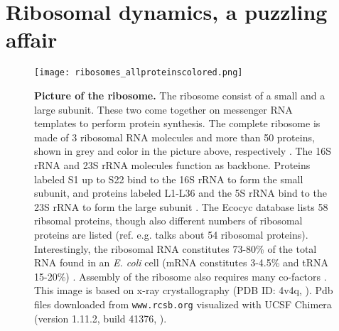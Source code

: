 



\chapter{Ribosomal dynamics, a puzzling affair}
\label{chapter:ribosomes}



\begin{figure}
    \centering    
    \texttt{[image: ribosomes\_allproteinscolored.png]}
    \caption{ 
        \textbf{Picture of the ribosome.}
        The ribosome consist of a small and a large subunit. These two come together on messenger RNA templates to perform protein synthesis.
        The complete ribosome is made of 3 ribosomal RNA molecules and more than 50 proteins, shown in grey and color in the picture above, respectively \cite{Chen2013}.
        The 16S rRNA and 23S rRNA molecules function as backbone. %
        Proteins labeled S1 up to S22 
        bind to the 16S rRNA to form the small subunit, and proteins labeled L1-L36 and the 5S rRNA bind to the 23S rRNA to form the large subunit \cite{Keseler2017}.
        The Ecocyc database lists 58 ribsomal proteins, though also different numbers of ribosomal proteins are listed (ref. \cite{Chen2013} e.g. talks about 54 ribosomal proteins).
        Interestingly, the ribosomal RNA constitutes 73-80\% of the total RNA found in an \textit{E. coli} cell (mRNA constitutes 3-4.5\% and tRNA 15-20\%) \cite{Norris1972}.
        Assembly of the ribosome also requires many co-factors \cite{Chen2013}. %
        This image is based on x-ray crystallography (PDB ID: 4v4q, \cite{Schuwirth2005}). Pdb files downloaded from \texttt{www.rcsb.org} \cite{Berman2000} 
        visualized with UCSF Chimera (version 1.11.2, build 41376, \cite{pettersen2004}).
    }
    \label{fig:ribo:pictureofribo}
\end{figure}

